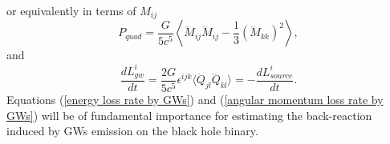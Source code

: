 or equivalently in terms of $M_{ij}$
\begin{equation}\label{P_quad in terms of M_ij}
     P_{quad}=\frac{G}{5c^5}\left\langle\dddot{M}_{ij}\dddot{M}_{ij}-\frac{1}{3}(\dddot{M}_{kk})^2\right\rangle,
\end{equation}
and 
\begin{equation}\label{angular momentum loss rate by GWs}
    \frac{dL^i_{gw}}{dt}=\frac{2G}{5c^5}\epsilon^{ijk}\langle\ddot{Q}_{jl}\dddot{Q}_{kl}\rangle=-\frac{dL^i_{source}}{dt}.
\end{equation}
Equations (\ref{energy loss rate by GWs}) and (\ref{angular momentum loss rate by GWs}) will be of fundamental importance for estimating the back-reaction induced by GWs emission on the black hole binary.















